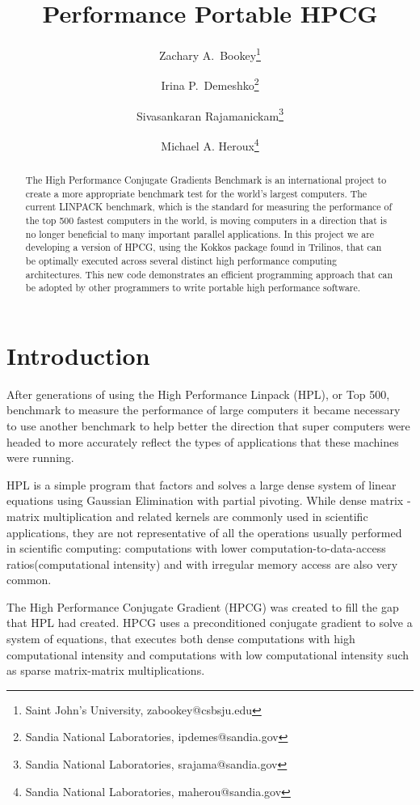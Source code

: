 \documentclass{ccr15}
\title{Performance Portable HPCG}
\author{Zachary A.\ Bookey\thanks{Saint John's University, zabookey@csbsju.edu} \and Irina P.\ Demeshko\thanks{Sandia National Laboratories,
ipdemes@sandia.gov} \and Sivasankaran Rajamanickam\thanks{Sandia National Laboratories, srajama@sandia.gov}\and Michael A. Heroux\thanks{Sandia National Laboratories, maherou@sandia.gov}}
\begin{document}
\maketitle
\begin{abstract}
The High Performance Conjugate Gradients Benchmark is an international project to create a
more appropriate benchmark test for the world's largest computers. The current LINPACK benchmark,
which is the standard for measuring the performance of the top 500 fastest computers in the
world, is moving computers in a direction that is no longer beneficial to many important
parallel applications. In this project we are developing a version of HPCG, using the Kokkos
package found in Trilinos, that can be optimally executed across several distinct high
performance computing architectures. This new code demonstrates an efficient programming
approach that can be adopted by other programmers to write portable high performance software.
\end{abstract}

\section{Introduction}

After generations of using the High Performance Linpack (HPL), or Top 500, benchmark \cite{ZAB:Top500} to measure the
performance of large computers it became necessary to use another benchmark to help better the
direction that super computers were headed to more accurately reflect the types of applications
that these machines were running.

HPL is a simple program that factors and solves a large dense system of linear equations using
Gaussian Elimination with partial pivoting.
While dense matrix - matrix multiplication and related kernels are commonly used in scientific applications,
they are not representative of all the operations usually performed in scientific computing:
computations with lower computation-to-data-access ratios(computational intensity) and with
irregular memory access are also very common.

The High Performance Conjugate Gradient (HPCG)\cite{ZAB:TechHPCG}\cite{ZAB:TechHPCG2} was created to fill the gap that HPL had created.
HPCG uses a preconditioned conjugate gradient to solve a system of equations, that executes both
dense computations with high computational intensity and computations with low computational intensity such as sparse matrix-matrix multiplications.
\end{document}
